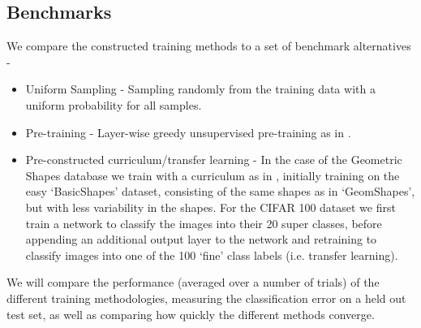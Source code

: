 \documentclass[a4paper,11pt]{article}
\begin{document}
\subsection*{Benchmarks}
We compare the constructed training methods to a set of benchmark alternatives -
\begin{itemize}
	\item Uniform Sampling - Sampling randomly from the training data with a uniform probability for all samples.
	\item Pre-training - Layer-wise greedy unsupervised pre-training as in \cite{Erhan 09}.
	\item Pre-constructed curriculum/transfer learning - In the case of the Geometric Shapes database we train with a curriculum as in \cite{Bengio 09}, initially training on the easy `BasicShapes' dataset, consisting of the same shapes as in `GeomShapes', but with less variability in the shapes. For the CIFAR 100 dataset we first train a network to classify the images into their 20 super classes, before appending an additional output layer to the network and retraining to classify images into one of the 100 `fine' class labels (i.e. transfer learning). 
\end{itemize}
We will compare the performance (averaged over a number of trials) of the different training methodologies, measuring the classification error on a held out test set, as well as comparing how quickly the different methods converge. 
\end{document}
